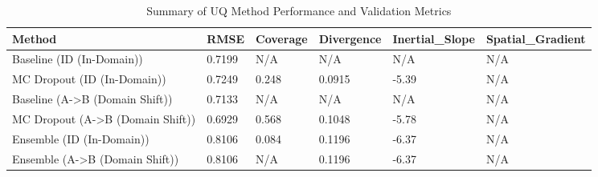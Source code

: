 \begin{table}
\caption{Summary of UQ Method Performance and Validation Metrics}
\label{tab:uq_summary}
\begin{tabular}{llllll}
\toprule
Method & RMSE & Coverage & Divergence & Inertial_Slope & Spatial_Gradient \\
\midrule
Baseline (ID (In-Domain)) & 0.7199 & N/A & N/A & N/A & N/A \\
MC Dropout (ID (In-Domain)) & 0.7249 & 0.248 & 0.0915 & -5.39 & N/A \\
Baseline (A->B (Domain Shift)) & 0.7133 & N/A & N/A & N/A & N/A \\
MC Dropout (A->B (Domain Shift)) & 0.6929 & 0.568 & 0.1048 & -5.78 & N/A \\
Ensemble (ID (In-Domain)) & 0.8106 & 0.084 & 0.1196 & -6.37 & N/A \\
Ensemble (A->B (Domain Shift)) & 0.8106 & N/A & 0.1196 & -6.37 & N/A \\
\bottomrule
\end{tabular}
\end{table}
